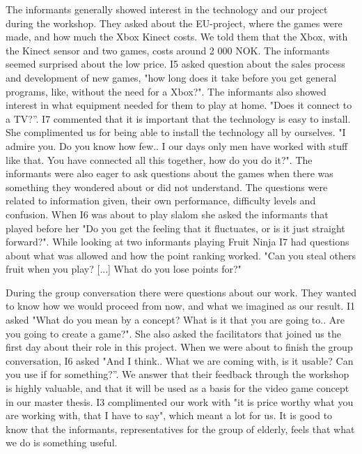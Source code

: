 The informants generally showed interest in the technology and our project during the workshop. They asked about the EU-project, where the games were made, and how much the Xbox Kinect costs. We told them that the Xbox, with the Kinect sensor and two games, costs around 2 000 NOK. The informants seemed surprised about the low price. I5 asked question about the sales process and development of new games, "how long does it take before you get general programs, like, without the need for a Xbox?". The informants also showed interest in what equipment needed for them to play at home. "Does it connect to a TV?”. I7 commented that it is important that the technology is easy to install. She complimented us for being able to install the technology all by ourselves. "I admire you. Do you know how few.. I our days only men have worked with stuff like that. You have connected all this together, how do you do it?".  The informants were also eager to ask questions about the games when there was something they wondered about or did not understand. The questions were related to information given, their own performance, difficulty levels and confusion. When I6 was about to play slalom she asked the informants that played before her "Do you get the feeling that it fluctuates, or is it just straight forward?". While looking at two informants playing Fruit Ninja I7 had questions about what was allowed and how the point ranking worked. "Can you steal others fruit when you play? [...] What do you lose points for?" 

During the group conversation there were questions about our work. They wanted to know how we would proceed from now, and what we imagined as our result. I1 asked "What do you mean by a concept? What is it that you are going to.. Are you going to create a game?". She also asked the facilitators that joined us the first day about their role in this project. When we were about to finish the group conversation, I6 asked "And I think.. What we are coming with, is it usable? Can you use if for something?”. We answer that their feedback through the workshop is highly valuable, and that it will be used as a basis for the video game concept in our master thesis. I3 complimented our work with "it is price worthy what you are working with, that I have to say", which meant a lot for us. It is good to know that the informants, representatives for the group of elderly, feels that what we do is something useful.  


